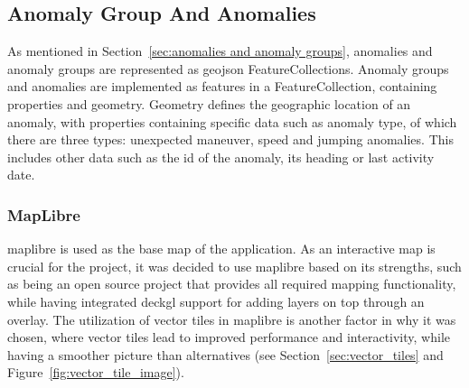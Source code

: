 \subsection{Anomaly Group And Anomalies}

As mentioned in Section~\ref{sec:anomalies and anomaly groups}, anomalies and anomaly groups are represented as \acrshort{geojson} FeatureCollections. Anomaly groups and anomalies are implemented as features in a FeatureCollection, containing properties and geometry. Geometry defines the geographic location of an anomaly, with properties containing specific data such as anomaly type, of which there are three types: unexpected maneuver, speed and jumping anomalies. This includes other data such as the \acrshort{id} of the anomaly, its heading or last activity date.




\subsubsection{MapLibre}

\gls{maplibre} is used as the base map of the application. As an interactive map is crucial for the project, it was decided to use \gls{maplibre} based on its strengths, such as being an open source project that provides all required mapping functionality, while having integrated \gls{deckgl} support for adding layers on top through an overlay. The utilization of vector tiles in \gls{maplibre} is another factor in why it was chosen, where vector tiles lead to improved performance and interactivity, while having a smoother picture than alternatives (see Section~\ref{sec:vector_tiles} and Figure~\ref{fig:vector_tile_image}).


